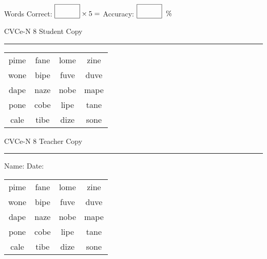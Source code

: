\documentclass{memoir}
\begin{document}
\small

Words Correct: $\fbox{\phantom{\huge 100}} \times 5 = $ Accuracy: $\fbox{\phantom{\huge 100}}\;\; \%$ 

\vfill

\newpage


\footnotesize \noindent
CVCe-N 8 \hfill Student Copy
\smallskip
\hrule

\Large

\setlength{\tabcolsep}{14pt}
\def\arraystretch{2}

{\selectfont


\begin{vplace}[0.5]
\begin{center}
\begin{tabular}{cccc}
pime & fane & lome & zine \\
wone & bipe & fuve & duve \\
dape & naze & nobe & mape \\
pone & cobe & lipe & tane \\
cale & tibe & dize & sone \\
\end{tabular}
\end{center}
\end{vplace}

}

\newpage

\footnotesize \noindent
CVCe-N 8 \hfill Teacher Copy
\smallskip
\hrule

\small

\vfill

\noindent
Name: \underline{\hspace{1.75in}} \hfill Date: \underline{\hspace{1in}}

\Large

{\selectfont


\begin{vplace}[0.5]
\begin{center}
\begin{tabular}{cccc}
pime & fane & lome & zine \\
wone & bipe & fuve & duve \\
dape & naze & nobe & mape \\
pone & cobe & lipe & tane \\
cale & tibe & dize & sone \\
\end{tabular}
\end{center}
\end{vplace}



}
\end{document}
